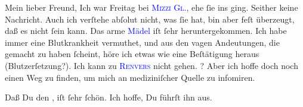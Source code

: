 \pstart\center{}Mein lieber Freund,\pend
\pstart
           Ich war Freitag bei \textsc{\textcolor{blue}{Mizzi Gl.}{}\ledrightnote{\textcolor{blue}{Marie Glümer}}}, ehe ſie ins \label{K_L03059-7v}\label{K_L03059-7h} ging. Seither
               keine Nachricht. Auch ich verſtehe abſolut nicht, was ſie hat, bin aber feſt
               überzeugt, daß es nicht \label{K_L03059-1v}\label{K_L03059-1h} ſein kann. Das arme \textcolor{blue}{Mädel}{}\ledrightnote{{$\rightarrow$}\textcolor{blue}{Marie Glümer}} iſt ſehr heruntergekommen. Ich habe immer eine Blutkrankheit
               vermuthet, und aus den vagen Andeutungen, die \label{K_L03059-5v}\label{K_L03059-5h} gemacht zu haben ſcheint, höre ich etwas wie eine Beſtätigung heraus
               (Blutzerſetzung?). Ich kann zu \textsc{\textcolor{blue}{Renvers}{}\ledrightnote{\textcolor{blue}{Rudolf Renvers}}} nicht gehen. \label{K_L03059-4v}\label{K_L03059-4h}? Aber ich hoffe doch noch einen Weg zu finden, um mich an
               mediziniſcher Quelle zu infomiren.\pend
           
\pstart
           Daß Du den \label{K_L03059-3v}\label{K_L03059-3h}, iſt ſehr ſchön. Ich hoffe, Du
               führſt ihn aus.\pend
           
